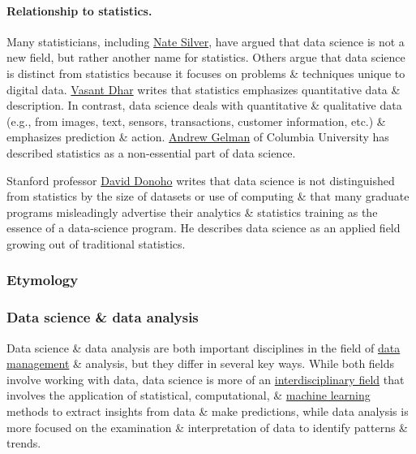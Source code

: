 \documentclass{article}
\begin{document}
\paragraph{Relationship to statistics.} Many statisticians, including \href{https://en.wikipedia.org/wiki/Nate_Silver}{Nate Silver}, have argued that data science is not a new field, but rather another name for statistics. Others argue that data science is distinct from statistics because it focuses on problems \& techniques unique to digital data. \href{https://en.wikipedia.org/wiki/Vasant_Dhar}{Vasant Dhar} writes that statistics emphasizes quantitative data \& description. In contrast, data science deals with quantitative \& qualitative data (e.g., from images, text, sensors, transactions, customer information, etc.) \& emphasizes prediction \& action. \href{https://en.wikipedia.org/wiki/Andrew_Gelman}{Andrew Gelman} of Columbia University has described statistics as a non-essential part of data science.

Stanford professor \href{https://en.wikipedia.org/wiki/David_Donoho}{David Donoho} writes that data science is not distinguished from statistics by the size of datasets or use of computing \& that many graduate programs misleadingly advertise their analytics \& statistics training as the essence of a data-science program. He describes data science as an applied field growing out of traditional statistics.

\subsubsection{Etymology}

\subsubsection{Data science \& data analysis}
Data science \& data analysis are both important disciplines in the field of \href{https://en.wikipedia.org/wiki/Data_management}{data management} \& analysis, but they differ in several key ways. While both fields involve working with data, data science is more of an \href{https://en.wikipedia.org/wiki/Interdisciplinary_field}{interdisciplinary field} that involves the application of statistical, computational, \& \href{https://en.wikipedia.org/wiki/Machine_learning}{machine learning} methods to extract insights from data \& make predictions, while data analysis is more focused on the examination \& interpretation of data to identify patterns \& trends.
\end{document}
